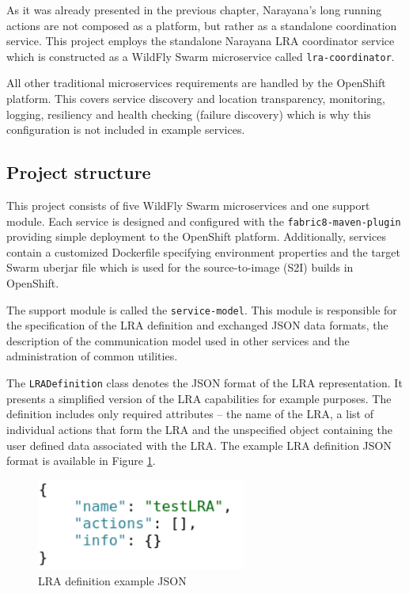 \documentclass[oneside,
  digital, %
  table,   %
  lof,     %
  lot,     %
]{fithesis3}
\begin{document}
As it was already presented in the previous chapter, Narayana's long running actions are not composed as a platform, but rather as a standalone coordination service. This project employs the standalone Narayana LRA coordinator service which is constructed as a WildFly Swarm microservice called \texttt{lra-coordinator}. 

All other traditional microservices requirements are handled by the OpenShift platform. This covers service discovery and location transparency, monitoring, logging, resiliency and health checking (failure discovery) which is why this configuration is not included in example services.


\subsection{Project structure}

This project consists of five WildFly Swarm microservices and one support module. Each service is designed and configured with the \texttt{fabric8-maven-plugin} providing simple deployment to the OpenShift platform. Additionally, services contain a customized Dockerfile specifying environment properties and the target Swarm uberjar file which is used for the source-to-image (S2I) builds in OpenShift.

The support module is called the \texttt{service-model}. This module is responsible for the specification of the LRA definition and exchanged JSON data formats, the description of the communication model used in other services and the administration of common utilities.

The \texttt{LRADefinition} class denotes the JSON format of the LRA representation. It presents a simplified version of the LRA capabilities for example purposes. The definition includes only required attributes -- the name of the LRA, a list of individual actions that form the LRA and the unspecified object containing the user defined data associated with the LRA. The example LRA definition JSON format is available in Figure \ref{fig:lra-json}.

\begin{figure}[h]
    \begin{center}
        \includegraphics[height=30mm]{images/LRADefinition.png}
    \end{center}
    \caption{LRA definition example JSON}
    \label{fig:lra-json}
\end{figure}
\end{document}
